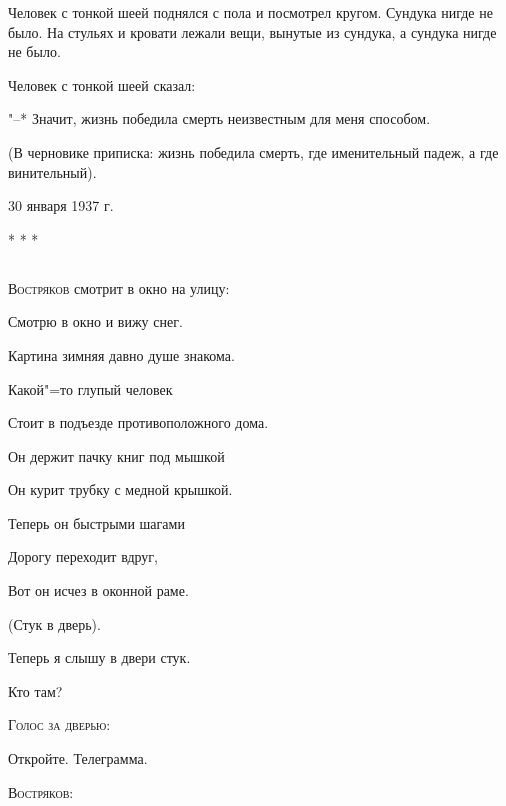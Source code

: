 \documentclass{article}
\begin{document}
    Человек с тонкой шеей поднялся с пола  и
посмотрел кругом. Сундука нигде не было.  На
стульях  и  кровати лежали вещи,  вынутые из
сундука, а сундука нигде не было.

    Человек с тонкой шеей сказал:

    "--* Значит, жизнь  победила  смерть  
    неизвестным для меня способом.

    (В  черновике приписка:  жизнь  победила
смерть, где именительный падеж,  а где винительный).
\begin{flushright}
30 января 1937 г.
\end{flushright}
                        

\begin{center}
    * * *
\end{center}

\begin{center}					
\section*{}			
\end{center}	

\begin{flushleft}
\textsc{Востряков} смотрит в окно на улицу:
\end{flushleft}

   Смотрю в окно и вижу снег.

   Картина зимняя давно душе знакома.

   Какой"=то глупый человек

   Стоит в подъезде противоположного дома.

   Он держит пачку книг под мышкой

   Он курит трубку с медной крышкой.

   Теперь он быстрыми шагами

   Дорогу переходит вдруг,

   Вот он исчез в оконной раме.

   \begin{center}
    (Стук в дверь).
   \end{center}
   
   Теперь я слышу в двери стук.

   Кто там?
\begin{flushleft}
    \textsc{Голос за дверью:}
\end{flushleft}

   Откройте. Телеграмма.

\begin{flushleft}
    \textsc{Востряков:}
\end{flushleft}
\end{document}
